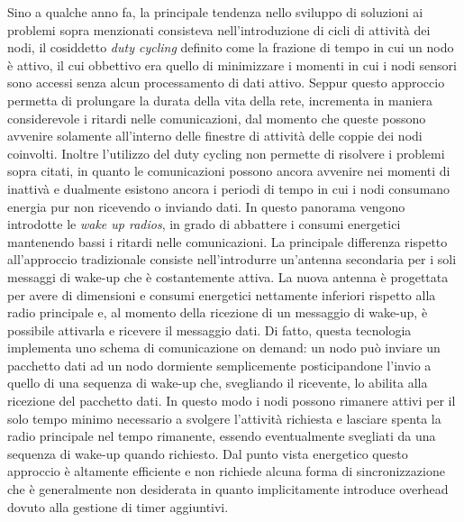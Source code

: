 \documentclass[binding=0.6cm,Lau,noexaminfo]{sapthesis}
\begin{document}
Sino a qualche anno fa, la principale tendenza nello sviluppo di soluzioni ai problemi sopra menzionati consisteva nell'introduzione di cicli di attività
dei nodi, il cosiddetto \emph{duty cycling} definito come la frazione di tempo in cui un nodo è attivo, il cui obbettivo era quello di minimizzare i momenti
in cui i nodi sensori sono accessi senza alcun processamento di dati attivo. Seppur questo approccio permetta di prolungare la durata della vita della rete,
incrementa in maniera considerevole i ritardi nelle comunicazioni, dal momento che queste possono avvenire solamente all'interno delle finestre di attività
delle coppie dei nodi coinvolti. Inoltre l'utilizzo del duty cycling non permette di risolvere i problemi sopra citati, in quanto le comunicazioni
possono ancora avvenire nei momenti di inattivà e dualmente esistono ancora i periodi di tempo in cui i nodi consumano energia pur non ricevendo o inviando dati.
In questo panorama vengono introdotte le \emph{wake up radios}, in grado di abbattere i consumi energetici mantenendo bassi i ritardi nelle comunicazioni.
La principale differenza rispetto all'approccio tradizionale consiste nell'introdurre un'antenna secondaria per i soli messaggi di wake-up che è costantemente
attiva. La nuova antenna è progettata per avere di dimensioni e consumi energetici nettamente inferiori rispetto alla radio principale e, al momento della ricezione
di un messaggio di wake-up, è possibile attivarla e ricevere il messaggio dati. Di fatto, questa tecnologia implementa uno schema di comunicazione on demand:
un nodo può inviare un pacchetto dati ad un nodo dormiente semplicemente  posticipandone l'invio a quello di una sequenza di wake-up che, svegliando il ricevente,
lo abilita alla ricezione del pacchetto dati. In questo modo i nodi possono rimanere attivi per il solo tempo minimo necessario a svolgere l'attività richiesta
e lasciare spenta la radio principale nel tempo rimanente, essendo eventualmente svegliati da una sequenza di wake-up quando richiesto.
Dal punto vista energetico questo approccio è altamente efficiente e non richiede alcuna forma di sincronizzazione che è generalmente non desiderata in quanto
implicitamente introduce overhead dovuto alla gestione di timer aggiuntivi.\\
\end{document}
